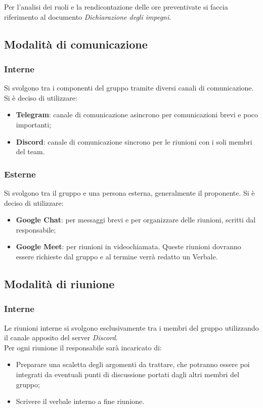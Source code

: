             Per l'analisi dei ruoli e la rendicontazione delle ore preventivate si faccia riferimento al documento \textit{Dichiarazione degli impegni}.

    \subsection{Modalità di comunicazione}
        \subsubsection{Interne}
        Si svolgono tra i componenti del gruppo tramite diversi canali di comunicazione.\\
        Si è deciso di utilizzare:
        \begin{itemize}
            \item \textbf{Telegram}: canale di comunicazione asincrono per comunicazioni brevi e poco importanti;
            \item \textbf{Discord}: canale di comunicazione sincrono per le riunioni con i soli membri del team.\\ 
        \end{itemize}
        \subsubsection{Esterne}
        Si svolgono tra il gruppo e una persona esterna, generalmente il proponente.
        Si è deciso di utilizzare:
        \begin{itemize}
            \item \textbf{Google Chat}: per messaggi brevi e per organizzare delle riunioni, scritti dal responsabile;
            \item \textbf{Google Meet}: per riunioni in videochiamata. Queste riunioni dovranno essere richieste
            dal gruppo e al termine verrà redatto un Verbale.
        \end{itemize}


    \subsection{Modalità di riunione}
        \subsubsection{Interne}
        Le riunioni interne si svolgono esclusivamente tra i membri del gruppo utilizzando il canale apposito
        del server \textit{Discord}.\\
        Per ogni riunione il responsabile sarà incaricato di:
        \begin{itemize}
            \item Preparare una scaletta degli argomenti da trattare, che potranno essere poi integrati da eventuali
            punti di discussione portati dagli altri membri del gruppo;
            \item Scrivere il verbale interno a fine riunione.
        \end{itemize}

